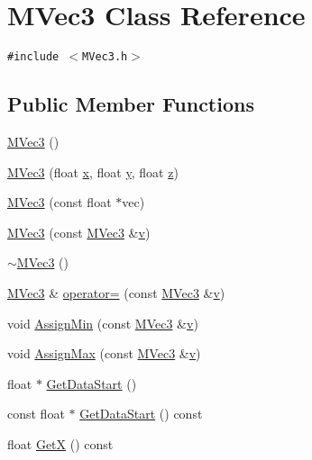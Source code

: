 \hypertarget{class_m_vec3}{
\section{MVec3 Class Reference}
\label{class_m_vec3}
}
{\tt \#include $<$MVec3.h$>$}

\subsection*{Public Member Functions}
\begin{CompactItemize}
\item 
\hyperlink{class_m_vec3_6ba0f0bb219d11a10b7b028fb45d6146}{MVec3} ()
\item 
\hyperlink{class_m_vec3_fca7472b1db64da1af3dfc6c0397e3a7}{MVec3} (float \hyperlink{wglext_8h_d77deca22f617d3f0e0eb786445689fc}{x}, float \hyperlink{wglext_8h_9298c7ad619074f5285b32c6b72bfdea}{y}, float \hyperlink{glext__bak_8h_5b27107fca91cf19a778530405575b37}{z})
\item 
\hyperlink{class_m_vec3_b68860076beec4cccc14fd176bfac615}{MVec3} (const float $\ast$vec)
\item 
\hyperlink{class_m_vec3_acfa4e2533d822d2f8c9e3725011960a}{MVec3} (const \hyperlink{class_m_vec3}{MVec3} \&\hyperlink{glext__bak_8h_5cf89b94f7478c0ebc4429b60e7ef93b}{v})
\item 
\hyperlink{class_m_vec3_c486b557acdf616a7d95babc21a7cd89}{$\sim$MVec3} ()
\item 
\hyperlink{class_m_vec3}{MVec3} \& \hyperlink{class_m_vec3_8d03c2d18357d0701f0f626d9db001cd}{operator=} (const \hyperlink{class_m_vec3}{MVec3} \&\hyperlink{glext__bak_8h_5cf89b94f7478c0ebc4429b60e7ef93b}{v})
\item 
void \hyperlink{class_m_vec3_4b4aa3eef6d824a331b36b7f559b29ac}{AssignMin} (const \hyperlink{class_m_vec3}{MVec3} \&\hyperlink{glext__bak_8h_5cf89b94f7478c0ebc4429b60e7ef93b}{v})
\item 
void \hyperlink{class_m_vec3_a2bca5724dbee66428e3cce3d1c75070}{AssignMax} (const \hyperlink{class_m_vec3}{MVec3} \&\hyperlink{glext__bak_8h_5cf89b94f7478c0ebc4429b60e7ef93b}{v})
\item 
float $\ast$ \hyperlink{class_m_vec3_a4f6338cc24ff6d594577877c261ebd8}{GetDataStart} ()
\item 
const float $\ast$ \hyperlink{class_m_vec3_a36437bab4444c4ae78baa21ebcea624}{GetDataStart} () const 
\item 
float \hyperlink{class_m_vec3_8b834219441d8d65b3e4df28fe03f60f}{GetX} () const 

\end{CompactItemize}
